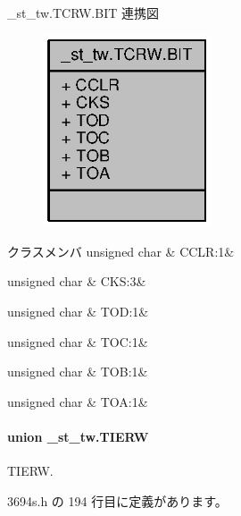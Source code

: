 \+\_\+st\+\_\+tw.\+T\+C\+R\+W.\+B\+I\+T 連携図
\nopagebreak
\begin{figure}[H]
\begin{center}
\leavevmode
\includegraphics[width=141pt]{db/db6/struct__st__tw_8TCRW_8BIT__coll__graph}
\end{center}
\end{figure}
\begin{DoxyFields}{クラスメンバ}
unsigned char\label{3694s_8h_ac3edc53cb9cfad8845e25009abc6d8f9}
&
C\+C\+L\+R\+:1&
\\
\hline

unsigned char\label{3694s_8h_a62e08e3df930b3022644f9943263a758}
&
C\+K\+S\+:3&
\\
\hline

unsigned char\label{3694s_8h_aced08f9753e42c326f2543214af8dd94}
&
T\+O\+D\+:1&
\\
\hline

unsigned char\label{3694s_8h_a6994206aa5146e62315e61b6ecf6f56b}
&
T\+O\+C\+:1&
\\
\hline

unsigned char\label{3694s_8h_a9d33a6d2a4c187d2d30b8c8991337426}
&
T\+O\+B\+:1&
\\
\hline

unsigned char\label{3694s_8h_a39c3867bc992e67140bec331f3007b98}
&
T\+O\+A\+:1&
\\
\hline

\end{DoxyFields}
\label{union__st__tw_8TIERW}
\paragraph{union \+\_\+st\+\_\+tw.\+T\+I\+E\+R\+W}
T\+I\+E\+R\+W. 

 3694s.\+h の 194 行目に定義があります。



